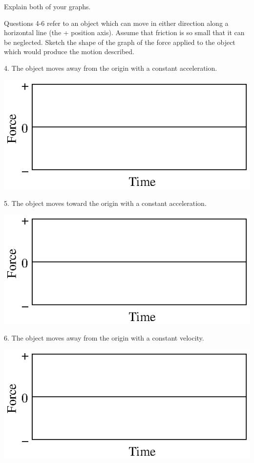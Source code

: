 Explain both of your graphs.
\vspace{20mm}

Questions 4-6 refer to an object which can move in either direction along a
horizontal line (the + position axis). Assume that friction is so small that
it can be neglected. Sketch the shape of the graph of the force applied to the
object which would produce the motion described. 

4. The object moves away from the origin with a constant acceleration.

\vspace{0.3cm}
{\par\centering \includegraphics{force1_fig10.eps} \par}
\vspace{0.3cm}

5. The object moves toward the origin with a constant acceleration.

\vspace{0.3cm}
{\par\centering \includegraphics{force1_fig10.eps} \par}
\vspace{0.3cm}

6. The object moves away from the origin with a constant velocity.

\vspace{0.3cm}
{\par\centering \includegraphics{force1_fig10.eps} \par}
\vspace{0.3cm}

